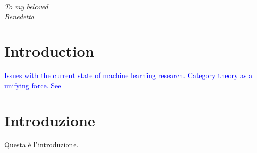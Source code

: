 \documentclass[12pt,a4paper,openright,twoside]{report}
\begin{document}
\begin{titlepage}
\thispagestyle{empty}                   
\topmargin=6.5cm                        
\raggedleft                             
\large                                  
                                       
\em                                     
To my beloved\\
Benedetta                   
\newpage                                

\clearpage{\pagestyle{empty}\cleardoublepage}
\end{titlepage}


            





\chapter*{Introduction}   




  \textcolor{blue}{
    Issues with the current state of machine learning research. Category theory as a unifying force. See  \cite{shieblerCategoryTheoryMachine2021}
  }







\chapter*{Introduzione}





  Questa \`e l'introduzione.







\end{document}
